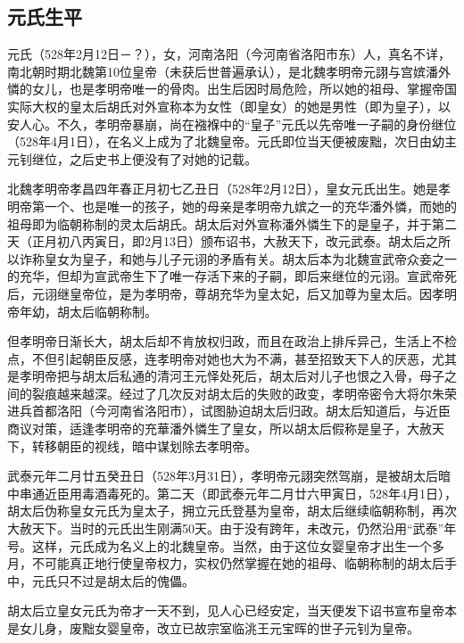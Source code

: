 
\subsection{元氏生平}

元氏（528年2月12日－？），女，河南洛阳（今河南省洛阳市东）人，真名不详，南北朝时期北魏第10位皇帝（未获后世普遍承认），是北魏孝明帝元詡与宫嫔潘外憐的女儿，也是孝明帝唯一的骨肉。出生后因时局危险，所以她的祖母、掌握帝国实际大权的皇太后胡氏对外宣称本为女性（即皇女）的她是男性（即为皇子），以安人心。不久，孝明帝暴崩，尚在襁褓中的“皇子”元氏以先帝唯一子嗣的身份继位（528年4月1日），在名义上成为了北魏皇帝。元氏即位当天便被废黜，次日由幼主元钊继位，之后史书上便没有了对她的记载。

北魏孝明帝孝昌四年春正月初七乙丑日（528年2月12日），皇女元氏出生。她是孝明帝第一个、也是唯一的孩子，她的母亲是孝明帝九嫔之一的充华潘外憐，而她的祖母即为临朝称制的灵太后胡氏。胡太后对外宣称潘外憐生下的是皇子，并于第二天（正月初八丙寅日，即2月13日）颁布诏书，大赦天下，改元武泰。胡太后之所以诈称皇女为皇子，和她与儿子元诩的矛盾有关。胡太后本为北魏宣武帝众妾之一的充华，但却为宣武帝生下了唯一存活下来的子嗣，即后来继位的元诩。宣武帝死后，元诩继皇帝位，是为孝明帝，尊胡充华为皇太妃，后又加尊为皇太后。因孝明帝年幼，胡太后临朝称制。

但孝明帝日渐长大，胡太后却不肯放权归政，而且在政治上排斥异己，生活上不检点，不但引起朝臣反感，连孝明帝对她也大为不满，甚至招致天下人的厌恶，尤其是孝明帝把与胡太后私通的清河王元怿处死后，胡太后对儿子也恨之入骨，母子之间的裂痕越来越深。经过了几次反对胡太后的失败的政变，孝明帝密令大将尔朱荣进兵首都洛阳（今河南省洛阳市），试图胁迫胡太后归政。胡太后知道后，与近臣商议对策，适逢孝明帝的充華潘外憐生了皇女，所以胡太后假称是皇子，大赦天下，转移朝臣的视线，暗中谋划除去孝明帝。

武泰元年二月廿五癸丑日（528年3月31日），孝明帝元詡突然驾崩，是被胡太后暗中串通近臣用毒酒毒死的。第二天（即武泰元年二月廿六甲寅日，528年4月1日），胡太后伪称皇女元氏为皇太子，拥立元氏登基为皇帝，胡太后继续临朝称制，再次大赦天下。当时的元氏出生刚满50天。由于没有跨年，未改元，仍然沿用“武泰”年号。这样，元氏成为名义上的北魏皇帝。当然，由于这位女婴皇帝才出生一个多月，不可能真正地行使皇帝权力，实权仍然掌握在她的祖母、临朝称制的胡太后手中，元氏只不过是胡太后的傀儡。

胡太后立皇女元氏为帝才一天不到，见人心已经安定，当天便发下诏书宣布皇帝本是女儿身，废黜女婴皇帝，改立已故宗室临洮王元宝晖的世子元钊为皇帝。

